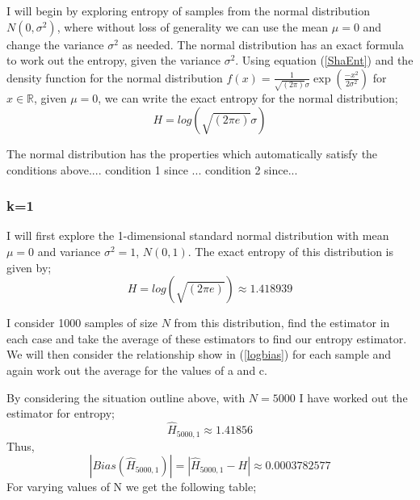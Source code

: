\documentclass{article}
\begin{document}
I will begin by exploring entropy of samples from the normal distribution $N(0, \sigma^2)$, where without loss of generality we can use the mean $\mu = 0$ and change the variance $\sigma^2$ as needed. The normal distribution has an exact formula to work out the entropy, given the variance $\sigma^2$. Using equation (\ref{ShaEnt}) and the density function for the normal distribution $f(x) = \frac{1}{\sqrt{(2\pi)} \sigma}\exp{ \left( \frac{-x^2}{2\sigma^2} \right)}$ for $x \in \mathbb{R}$, given $\mu = 0$, we can write the exact entropy for the normal distribution;
\begin{equation}
H = log(\sqrt{(2\pi e)}\sigma)
\end{equation}

The normal distribution has the properties which automatically satisfy the conditions above.... condition 1 since ... condition 2 since...



\subsubsection{k=1}
I will first explore the 1-dimensional standard normal distribution with mean $\mu = 0$ and variance $\sigma^2 = 1$, $N(0, 1)$. The exact entropy of this distribution is given by;
\begin{equation}
H = log(\sqrt{(2\pi e)}) \approx 1.418939
\end{equation}

I consider 1000 samples of size $N$ from this distribution, find the estimator in each case and take the average of these estimators to find our entropy estimator. We will then consider the relationship show in (\ref{logbias}) for each sample and again work out the average for the values of a and c. 

By considering the situation outline above, with $N=5000$ I have worked out the estimator for entropy;
\begin{equation}
\hat{H}_{5000, 1} \approx 1.41856
\end{equation}
Thus,
\begin{equation}
|Bias(\hat{H}_{5000, 1})| = |\hat{H}_{5000, 1} - H| \approx 0.0003782577 
\end{equation}
For varying values of N we get the following table;
\end{document}
